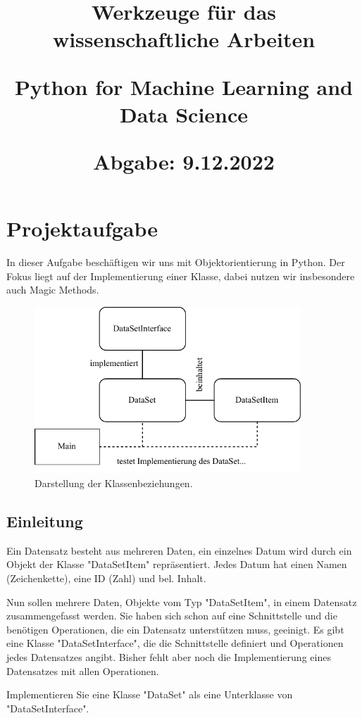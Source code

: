\documentclass[10pt, a4paper]{article}
\title{\textbf{\Large Werkzeuge für das wissenschaftliche Arbeiten} \par \textbf{\large Python for Machine Learning and Data Science} \par \normalsize Abgabe: 9.12.2022}
\author{}
\date{}
\begin{document}
		
\maketitle


\tableofcontents


\section{Projektaufgabe} 
In dieser Aufgabe beschäftigen wir uns mit Objektorientierung in Python.
Der Fokus liegt auf der Implementierung einer Klasse, dabei nutzen wir insbesondere auch Magic Methods.

\begin{figure}[h]
\centering
\includegraphics[width=10cm]{./../diagram/classes_files.pdf}
\caption{Darstellung der Klassenbeziehungen.}
\end{figure}

\subsection{Einleitung} 
Ein Datensatz besteht aus mehreren Daten, ein einzelnes Datum wird durch ein Objekt der Klasse "DataSetItem" repräsentiert.
Jedes Datum hat einen Namen (Zeichenkette), eine ID (Zahl) und bel. Inhalt.

Nun sollen mehrere Daten, Objekte vom Typ "DataSetItem", in einem Datensatz zusammengefasst werden.
Sie haben sich schon auf eine Schnittstelle und die benötigen Operationen, die ein Datensatz unterstützen muss, geeinigt.
Es gibt eine Klasse "DataSetInterface", die die Schnittstelle definiert und Operationen jedes Datensatzes angibt.
Bisher fehlt aber noch die Implementierung eines Datensatzes mit allen Operationen.

Implementieren Sie eine Klasse "DataSet" als eine Unterklasse von "DataSetInterface".
\end{document}
